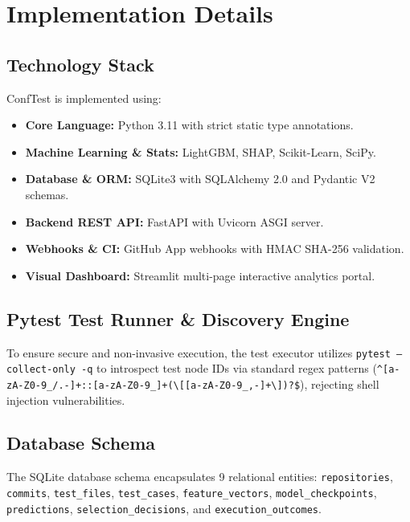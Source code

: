 \chapter{Implementation Details}

\section{Technology Stack}
ConfTest is implemented using:
\begin{itemize}
    \item \textbf{Core Language:} Python 3.11 with strict static type annotations.
    \item \textbf{Machine Learning \& Stats:} LightGBM, SHAP, Scikit-Learn, SciPy.
    \item \textbf{Database \& ORM:} SQLite3 with SQLAlchemy 2.0 and Pydantic V2 schemas.
    \item \textbf{Backend REST API:} FastAPI with Uvicorn ASGI server.
    \item \textbf{Webhooks \& CI:} GitHub App webhooks with HMAC SHA-256 validation.
    \item \textbf{Visual Dashboard:} Streamlit multi-page interactive analytics portal.
\end{itemize}

\section{Pytest Test Runner \& Discovery Engine}
To ensure secure and non-invasive execution, the test executor utilizes \texttt{pytest --collect-only -q} to introspect test node IDs via standard regex patterns (\texttt{\textasciicircum[a-zA-Z0-9\_/.-]+::[a-zA-Z0-9\_]+(\textbackslash[[a-zA-Z0-9\_,-]+\textbackslash])?\$}), rejecting shell injection vulnerabilities.

\section{Database Schema}
The SQLite database schema encapsulates 9 relational entities: \texttt{repositories}, \texttt{commits}, \texttt{test\_files}, \texttt{test\_cases}, \texttt{feature\_vectors}, \texttt{model\_checkpoints}, \texttt{predictions}, \texttt{selection\_decisions}, and \texttt{execution\_outcomes}.
